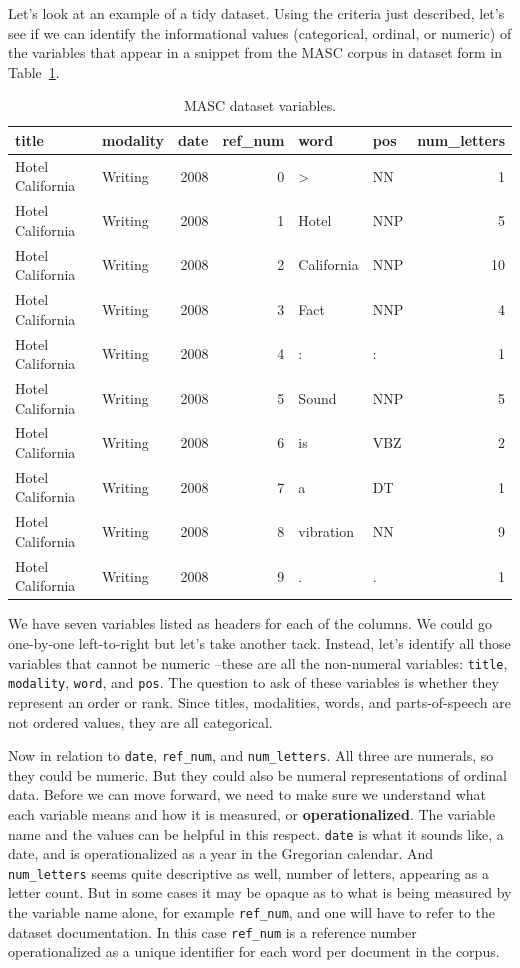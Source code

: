 \documentclass[
  letterpaper,
  DIV=11,
  numbers=noendperiod]{scrreport}
\theoremstyle{definition}
\theoremstyle{remark}
\begin{document}
Let's look at an example of a tidy dataset. Using the criteria just
described, let's see if we can identify the informational values
(categorical, ordinal, or numeric) of the variables that appear in a
snippet from the MASC corpus in dataset form in
Table~\ref{tbl-ud-info-values-masc}.

\hypertarget{tbl-ud-info-values-masc}{}
\begin{table}
\caption{\label{tbl-ud-info-values-masc}MASC dataset variables. }\tabularnewline

\centering
\begin{tabular}{llrrllr}
\toprule
title & modality & date & ref\_num & word & pos & num\_letters\\
\midrule
Hotel California & Writing & 2008 & 0 & > & NN & 1\\
Hotel California & Writing & 2008 & 1 & Hotel & NNP & 5\\
Hotel California & Writing & 2008 & 2 & California & NNP & 10\\
Hotel California & Writing & 2008 & 3 & Fact & NNP & 4\\
Hotel California & Writing & 2008 & 4 & : & : & 1\\
\addlinespace
Hotel California & Writing & 2008 & 5 & Sound & NNP & 5\\
Hotel California & Writing & 2008 & 6 & is & VBZ & 2\\
Hotel California & Writing & 2008 & 7 & a & DT & 1\\
Hotel California & Writing & 2008 & 8 & vibration & NN & 9\\
Hotel California & Writing & 2008 & 9 & . & . & 1\\
\bottomrule
\end{tabular}
\end{table}

We have seven variables listed as headers for each of the columns. We
could go one-by-one left-to-right but let's take another tack. Instead,
let's identify all those variables that cannot be numeric --these are
all the non-numeral variables: \texttt{title}, \texttt{modality},
\texttt{word}, and \texttt{pos}. The question to ask of these variables
is whether they represent an order or rank. Since titles, modalities,
words, and parts-of-speech are not ordered values, they are all
categorical.

Now in relation to \texttt{date}, \texttt{ref\_num}, and
\texttt{num\_letters}. All three are numerals, so they could be numeric.
But they could also be numeral representations of ordinal data. Before
we can move forward, we need to make sure we understand what each
variable means and how it is measured, or \textbf{operationalized}. The
variable name and the values can be helpful in this respect.
\texttt{date} is what it sounds like, a date, and is operationalized as
a year in the Gregorian calendar. And \texttt{num\_letters} seems quite
descriptive as well, number of letters, appearing as a letter count. But
in some cases it may be opaque as to what is being measured by the
variable name alone, for example \texttt{ref\_num}, and one will have to
refer to the dataset documentation. In this case \texttt{ref\_num} is a
reference number operationalized as a unique identifier for each word
per document in the corpus.
\end{document}
